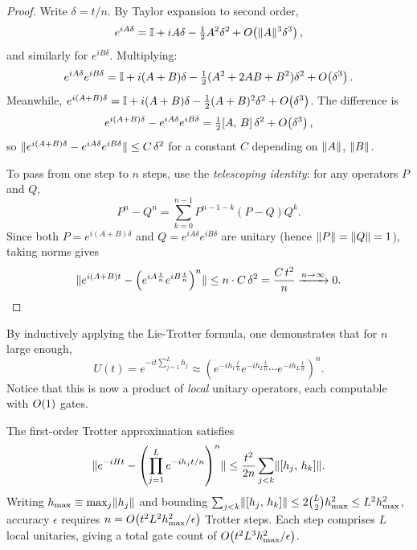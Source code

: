 \begin{proof}
  Write $\delta = t/n$.  By Taylor expansion to second order,
  \begin{equation}
    e^{iA\delta} = \mathbb{I} + iA\delta - \tfrac{1}{2}A^2\delta^2
    + O\!\left(\lVert A \rVert^3\delta^3\right),
  \end{equation}
  and similarly for $e^{iB\delta}$.  Multiplying:
  \begin{equation}\label{eq:trotter-single-step}
    e^{iA\delta}e^{iB\delta} = \mathbb{I} + i(A+B)\delta
    - \tfrac{1}{2}(A^2+2AB+B^2)\delta^2
    + O\!\left(\delta^3\right).
  \end{equation}
  Meanwhile, $e^{i(A+B)\delta} = \mathbb{I} + i(A+B)\delta
  - \frac{1}{2}(A+B)^2\delta^2 + O\!\left(\delta^3\right)$.
  The difference is
  \begin{equation}\label{eq:trotter-local-error}
    e^{i(A+B)\delta} - e^{iA\delta}e^{iB\delta}
    = \tfrac{1}{2}[A,\,B]\,\delta^2 + O\!\left(\delta^3\right),
  \end{equation}
  so
  $\lVert e^{i(A+B)\delta} - e^{iA\delta}e^{iB\delta} \rVert
  \le C\,\delta^2$ for a constant $C$ depending on $\lVert A \rVert$, $\lVert B \rVert$.

  To pass from one step to $n$ steps, use the \emph{telescoping identity}:
  for any operators $P$ and $Q$,
  \begin{equation}\label{eq:telescope}
    P^n - Q^n = \sum_{k=0}^{n-1} P^{n-1-k}(P-Q)Q^k.
  \end{equation}
  Since both $P = e^{i(A+B)\delta}$ and $Q = e^{iA\delta}e^{iB\delta}$ are
  unitary (hence $\lVert P \rVert=\lVert Q \rVert=1$), taking norms gives
  \begin{equation}
    \lVert e^{i(A+B)t} - \left(e^{iA\frac{t}{n}}e^{iB\frac{t}{n}}\right)^n \rVert
    \le n\cdot C\,\delta^2 = \frac{C\,t^2}{n}
    \xrightarrow{n\to\infty} 0.
    \qedhere
  \end{equation}
\end{proof}

By inductively applying the Lie-Trotter formula, one demonstrates that for
$n$ large enough,
\begin{equation}
  U(t) = e^{-it\sum_{j=1}^L h_j}
  \approx \left(e^{-i h_1\frac{t}{n}}e^{-i h_2\frac{t}{n}}
  \cdots e^{-i h_L\frac{t}{n}}\right)^{n}.
\end{equation}
Notice that this is now a product of \emph{local} unitary operators, each
computable with $O\!\left(1\right)$ gates.

\begin{keyresult}
  The first-order Trotter approximation satisfies
  \begin{equation}\label{eq:trotter-error-bound}
    \lVert e^{-iHt} - \left(\prod_{j=1}^L e^{-ih_j t/n}\right)^n \rVert
    \le \frac{t^2}{2n}\sum_{j<k}\lVert [h_j,\,h_k] \rVert.
  \end{equation}
  Writing $h_{\max}\equiv \max_j\lVert h_j \rVert$ and bounding
  $\sum_{j<k}\lVert [h_j,\,h_k] \rVert \le 2\binom{L}{2}h_{\max}^2
  \le L^2 h_{\max}^2$, accuracy $\epsilon$ requires
  $n = O\!\left(t^2 L^2 h_{\max}^2/\epsilon\right)$ Trotter steps.  Each step
  comprises $L$ local unitaries, giving a total gate count of
  $O\!\left(t^2 L^3 h_{\max}^2/\epsilon\right)$.
\end{keyresult}

